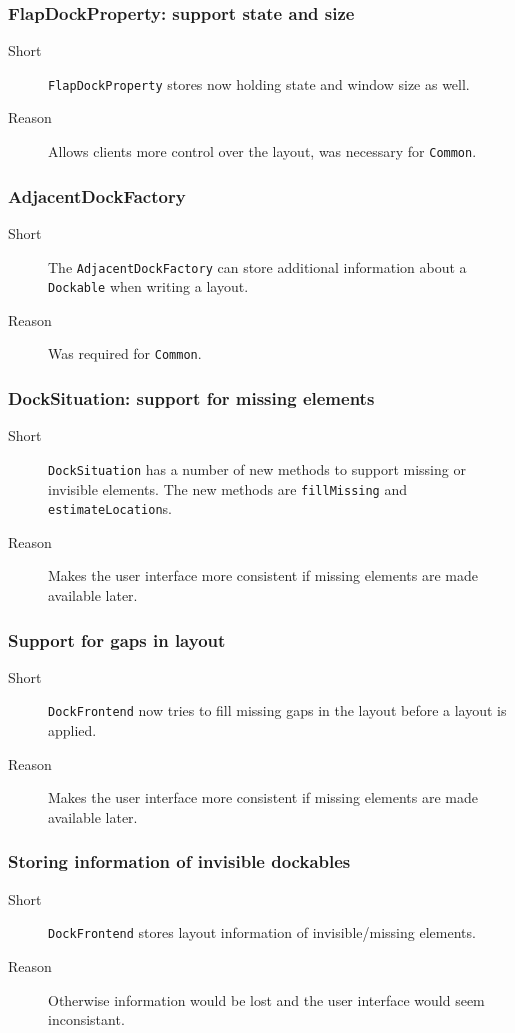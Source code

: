 \documentclass[a4paper,10pt]{article}
\newcommand{\src}[1]{\lstinline[basicstyle=\normalsize\ttfamily,keywordstyle=\normalsize\ttfamily,identifierstyle=\normalsize\ttfamily]|#1|}
\newcommand{\short}{\item[Short]}
\newcommand{\why}{\item[Reason]}
\begin{document}
\subsubsection{FlapDockProperty: support state and size}
\begin{description}
 \short \src{FlapDockProperty} stores now holding state and window size as well.
 \why Allows clients more control over the layout, was necessary for \src{Common}.
\end{description}

\subsubsection{AdjacentDockFactory}
\begin{description}
 \short The \src{AdjacentDockFactory} can store additional information about a \src{Dockable} when writing a layout.
 \why Was required for \src{Common}.
\end{description}

\subsubsection{DockSituation: support for missing elements}
\begin{description}
 \short \src{DockSituation} has a number of new methods to support missing or invisible elements. The new methods are \src{fillMissing} and \linebreak \src{estimateLocation}s.
 \why Makes the user interface more consistent if missing elements are made available later.
\end{description}

\subsubsection{Support for gaps in layout}
\begin{description}
 \short \src{DockFrontend} now tries to fill missing gaps in the layout before a layout is applied.
 \why Makes the user interface more consistent if missing elements are made available later.
\end{description}

\subsubsection{Storing information of invisible dockables}
\begin{description}
 \short \src{DockFrontend} stores layout information of invisible/missing elements.
 \why Otherwise information would be lost and the user interface would seem inconsistant.
\end{description}
\end{document}
